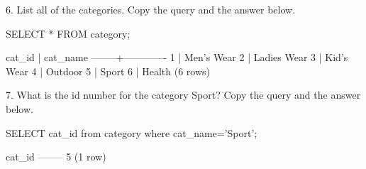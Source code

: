 6. List all of the categories. Copy the query and the answer below.
\begin{sql}
SELECT * FROM category;
\end{sql}
\begin{pseudo*}
 cat_id |  cat_name   
--------+-------------
      1 | Men's Wear
      2 | Ladies Wear
      3 | Kid's Wear
      4 | Outdoor
      5 | Sport
      6 | Health
(6 rows)
\end{pseudo*}

7. What is the id number for the category Sport? Copy the query and the answer below.
\begin{sql}
SELECT cat_id from category where cat_name='Sport';
\end{sql}
\begin{pseudo*}
 cat_id
--------
      5
(1 row)
\end{pseudo*}

